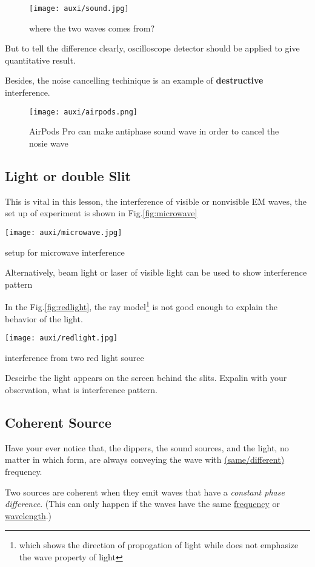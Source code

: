 \documentclass[a4paper]{tufte-handout}
\newenvironment{TaskBox} %
{\begin{tcolorbox}[breakable,colback=b1!30,colframe=b1,title=Task]} {\end{tcolorbox}}
\newenvironment{SummBox}
{\begin{tcolorbox}[breakable,colback=r1!30,colframe=r1,title=Summary]} {\end{tcolorbox}}
\begin{document}
\begin{figure}[h]
\centering
\texttt{[image: auxi/sound.jpg]}
\caption{where the two waves comes from?}
\label{fig:sound interference}
\end{figure}
But to tell the difference clearly, oscilloscope detector should be applied to give quantitative result.

Besides, the noise cancelling techinique is an example of \textbf{destructive} interference.
\begin{figure}[h]
\centering
\texttt{[image: auxi/airpods.png]}
\caption{AirPods Pro can make antiphase sound wave in order to cancel the nosie wave}
\end{figure}


\subsection{Light or double Slit}
This is vital in this lesson, the interference of visible or nonvisible EM waves, the set up of experiment is shown in Fig.\ref{fig:microwave}
\begin{marginfigure}
\centering
\texttt{[image: auxi/microwave.jpg]}
\caption{setup for microwave interference}
\label{fig:microwave}
\end{marginfigure}

Alternatively, beam light or laser of visible light can be used to show interference pattern

In the Fig.\ref{fig:redlight}, the ray model\footnote{which shows the direction of propogation of light while does not emphasize the wave property of light} is not good enough to explain the behavior of the light.
\begin{marginfigure}
\centering
\texttt{[image: auxi/redlight.jpg]}
\caption{interference from two red light source}
\label{fig:redlight}
\end{marginfigure}

\begin{TaskBox}
Descirbe the light appears on the screen behind the slits.
\vspace{1in}
\tcblower
Expalin with your observation, what is interference pattern.
\vspace{1in}
\end{TaskBox}

\subsection{Coherent Source}
Have your ever notice that, the dippers, the sound sources, and the light, no matter in which form, are always conveying the wave with \uline{(same/different)} frequency.
\begin{SummBox}
Two sources are coherent when they emit waves that have a \emph{constant phase difference}. (This can only happen if the waves have the same \uline{frequency} or \uline{wavelength}.)
\end{SummBox}
\end{document}
